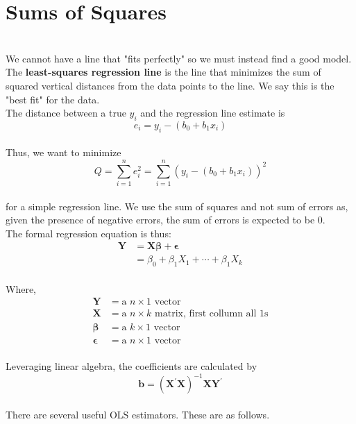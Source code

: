 \documentclass{article}
\begin{document}
\section{Sums of Squares} \label{ols}
  \\ We cannot have a line that "fits perfectly" so we must instead find a good model. The \textbf{least-squares regression line} is the line that minimizes the sum of squared vertical distances from the data points to the line. We say this is the "best fit" for the data.
  \\ The distance between a true $y_i$ and the regression line estimate is
  $$e_i=y_i-(b_0+b_1x_i)$$
  \\ Thus, we want to minimize
  $$Q=\sum_{i=1}^{n}e^2_i=\sum_{i=1}^{n}(y_i-(b_0+b_1x_i))^2$$
  \\ for a simple regression line. We use the sum of squares and not sum of errors as, given the presence of negative errors, the sum of errors is expected to be 0.
  \\ The formal regression equation is thus:
  $$$$
  \begin{equation}
  \begin{split}
    \pmb{Y} & =\pmb{X\beta +\epsilon} \\
    & = \beta_0+\beta_1 X_1 + \cdots + \beta_1 X_k
  \end{split}
  \end{equation}
  \\ Where,
    \begin{equation}
    \begin{split}
      \pmb{Y} & = \text{a } n \times 1 \text{ vector} \\
      \pmb{X} & = \text{a } n \times k \text{ matrix, first collumn all 1s} \\
      \pmb{\beta} & = \text{a } k \times 1 \text{ vector} \\
      \pmb{\epsilon} & = \text{a } n \times 1 \text{ vector}
    \end{split}
    \end{equation}
  \\ Leveraging linear algebra, the coefficients are calculated by
  $$\pmb{b}=(\pmb{X^\prime X})^{-1}\pmb{XY^\prime}$$
  \\ There are several useful OLS estimators. These are as follows.
\end{document}
